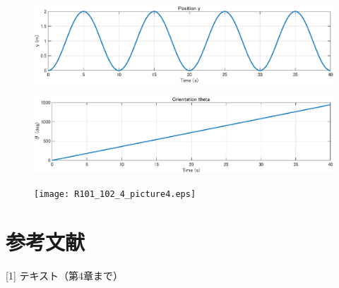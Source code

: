 \documentclass[10pt,a4paper,titlepage]{jreport} %
\begin{document}
\begin{figure}[H] %
  \centering
  \includegraphics[width=0.6\linewidth]{R101_102_4_picture2.eps} %
\end{figure}

\begin{figure}[H] %
  \centering
  \includegraphics[width=0.6\linewidth]{R101_102_4_picture3.eps} %
\end{figure}

\begin{figure}[H] %
  \centering
  \texttt{[image: R101\_102\_4\_picture4.eps]} %
\end{figure}

\chapter{参考文献}

[1] テキスト（第4章まで）
\end{document}

